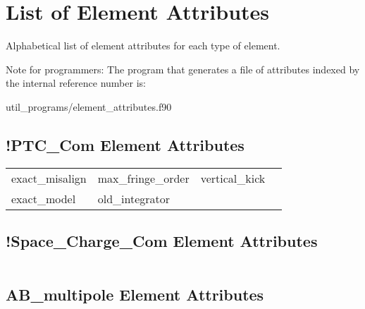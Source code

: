 \chapter{List of Element Attributes}
\label{c:attrib.list}

Alphabetical list of element attributes for each type of element. 

Note for programmers: The program that generates a file of attributes indexed by the
internal reference number is:
\begin{example}
  util_programs/element_attributes.f90 
\end{example}

 \section{!PTC_Com Element Attributes}
 \label{s:list.!ptc.com}
 
 \begin{tabular}{llll} \toprule
exact_misalign                   & max_fringe_order                 & vertical_kick                    &                                  \\
exact_model                      & old_integrator                   &                                  &                                  \\
 \bottomrule
 \end{tabular}
 \vfill
 
 \section{!Space_Charge_Com Element Attributes}
 \label{s:list.!space.charge.com}
 
 \begin{tabular}{llll} \toprule
 \bottomrule
 \end{tabular}
 \vfill
 
 \section{AB_multipole Element Attributes}
 \label{s:list.ab.multipole}
 
